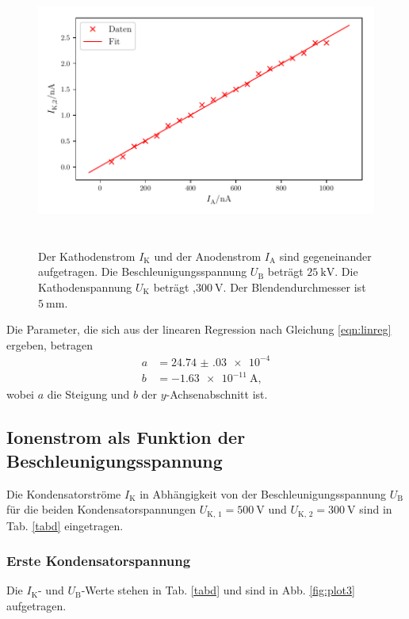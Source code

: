 \begin{figure}
    \centering
    \includegraphics[width=15cm, height=9cm]{build/plot2.pdf}
    \caption{Der Kathodenstrom $I_\text{K}$ und der Anodenstrom $I_\text{A}$ sind gegeneinander aufgetragen. Die Beschleunigungsspannung $U_\text{B}$ beträgt $\SI{25}{\kilo\volt}$. Die Kathodenspannung $U_\text{K}$ beträgt ,$\SI{300}{\volt}$. Der Blendendurchmesser ist $\SI{5}{\milli\meter}.$}
    \label{fig:plot2}
\end{figure}

\noindent Die Parameter, die sich aus der linearen Regression nach Gleichung \eqref{eqn:linreg} ergeben, betragen
\begin{align*}
    a &= \num{24.74(03)e-4}\\
    b &= \SI{-1.63e-11}{\ampere},
\end{align*}
wobei $a$ die Steigung und $b$ der $y$-Achsenabschnitt ist. 



\subsection{Ionenstrom als Funktion der Beschleunigungsspannung}

Die Kondensatorströme $I_\text{K}$ in Abhängigkeit von der
Beschleunigungsspannung $U_\text{B}$ für die beiden Kondensatorspannungen
$U_\text{K, 1} = \SI{500}{\volt}$ und $U_\text{K, 2} = \SI{300}{\volt}$
sind in Tab. \ref{tabd} eingetragen.

\subsubsection{Erste Kondensatorspannung}
Die $I_\text{K}$- und $U_\text{B}$-Werte stehen in Tab. \ref{tabd} und sind in Abb. \ref{fig:plot3} aufgetragen. 

